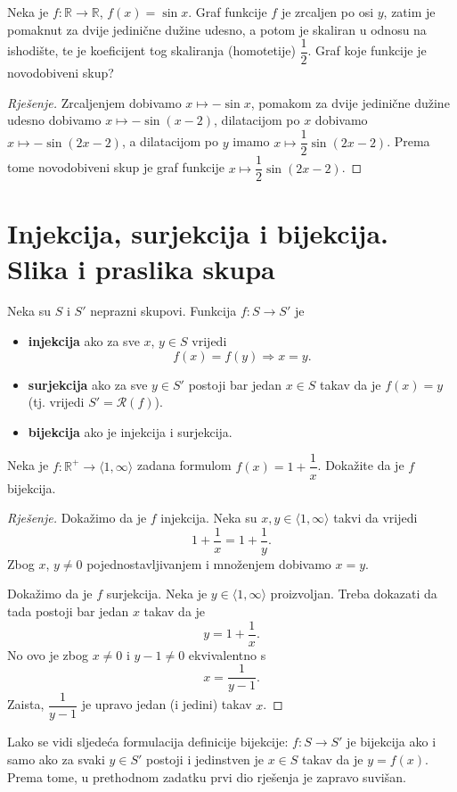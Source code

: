 \begin{exercise} Neka je $f : \mathbb{R}\to \mathbb{R}$, $f(x)=\sin{x}$. Graf funkcije $f$ je zrcaljen po osi $y$, zatim je pomaknut za dvije jedinične dužine udesno, a potom je skaliran u odnosu na ishodište, te je koeficijent tog skaliranja (homotetije) $\dfrac{1}{2}$. Graf koje funkcije je novodobiveni skup?
\end{exercise}
\begin{proof}[Rješenje]
Zrcaljenjem dobivamo $x\mapsto -\sin{x}$, pomakom za dvije jedinične dužine udesno dobivamo $x\mapsto -\sin(x-2)$, dilatacijom po $x$ dobivamo $x\mapsto -\sin\left(2x-2\right)$, a dilatacijom po $y$ imamo $x\mapsto \dfrac{1}{2}\sin(2x-2)$. Prema tome novodobiveni skup je graf funkcije $x\mapsto \dfrac{1}{2}\sin(2x-2)$.
\end{proof}

\section{Injekcija, surjekcija i bijekcija. Slika i praslika skupa}

\begin{definition}
Neka su $S$ i $S'$ neprazni skupovi. Funkcija $f : S\to S'$ je
\begin{itemize}
\item \textbf{injekcija} ako za sve $x$, $y\in S$ vrijedi $$f(x)=f(y)\Rightarrow x=y.$$
\item \textbf{surjekcija} ako za sve $y\in S'$ postoji bar jedan $x\in S$ takav da je $f(x)=y$ (tj. vrijedi $S'=\mathcal{R}(f)$).
\item \textbf{bijekcija} ako je injekcija i surjekcija.
\end{itemize}
\end{definition}

\begin{exercise}
Neka je $f : \mathbb{R}^+\to \langle 1, \infty\rangle $ zadana formulom $f(x)=1+\dfrac{1}{x}$. Dokažite da je $f$ bijekcija.
\end{exercise}
\begin{proof}[Rješenje]
Dokažimo da je $f$ injekcija. Neka su $x, y\in \langle 1, \infty\rangle$ takvi da vrijedi $$1+\dfrac{1}{x}=1+\dfrac{1}{y}.$$ Zbog $x$, $y\neq 0$ pojednostavljivanjem i množenjem dobivamo $x=y$. 

Dokažimo da je $f$ surjekcija. Neka je $y\in \langle 1, \infty\rangle$ proizvoljan. Treba dokazati da tada postoji bar jedan $x$ takav da je $$y=1+\dfrac{1}{x}.$$ No ovo je zbog $x\neq 0$ i $y-1\neq 0$ ekvivalentno s $$x=\dfrac{1}{y-1}.$$ Zaista, $\dfrac{1}{y-1}$ je upravo jedan (i jedini) takav $x$.
\end{proof}
\begin{remark}
Lako se vidi sljedeća formulacija definicije bijekcije: $f : S\to S'$ je bijekcija ako i samo ako za svaki $y\in S'$ postoji i jedinstven je $x\in S$ takav da je $y=f(x)$. Prema tome, u prethodnom zadatku prvi dio rješenja je zapravo suvišan.
\end{remark}

